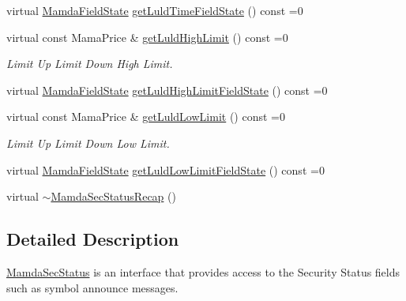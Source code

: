 \begin{CompactItemize}
virtual \hyperlink{namespaceWombat_93aac974f2ab713554fd12a1fa3b7d2a}{Mamda\-Field\-State} \hyperlink{classWombat_1_1MamdaSecStatusRecap_db80d6bb0167935b3b622d6dde3a42bd}{get\-Luld\-Time\-Field\-State} () const =0
\item 
virtual const Mama\-Price \& \hyperlink{classWombat_1_1MamdaSecStatusRecap_832c6a65be3a072fb3980f27661f3fd5}{get\-Luld\-High\-Limit} () const =0
\begin{CompactList}\small\item\em Limit Up Limit Down High Limit. \item\end{CompactList}\item 
virtual \hyperlink{namespaceWombat_93aac974f2ab713554fd12a1fa3b7d2a}{Mamda\-Field\-State} \hyperlink{classWombat_1_1MamdaSecStatusRecap_1c7c1b9dd0362117ad1e877fa24a3227}{get\-Luld\-High\-Limit\-Field\-State} () const =0
\item 
virtual const Mama\-Price \& \hyperlink{classWombat_1_1MamdaSecStatusRecap_5c40a583386f3c02006e31381fd99b17}{get\-Luld\-Low\-Limit} () const =0
\begin{CompactList}\small\item\em Limit Up Limit Down Low Limit. \item\end{CompactList}\item 
virtual \hyperlink{namespaceWombat_93aac974f2ab713554fd12a1fa3b7d2a}{Mamda\-Field\-State} \hyperlink{classWombat_1_1MamdaSecStatusRecap_8d51b8657752bef75f47ede1edd1ae6b}{get\-Luld\-Low\-Limit\-Field\-State} () const =0
\item 
virtual \hyperlink{classWombat_1_1MamdaSecStatusRecap_339807ec21e46d93961081c71b311b38}{$\sim$Mamda\-Sec\-Status\-Recap} ()
\end{CompactItemize}


\subsection{Detailed Description}
\hyperlink{classWombat_1_1MamdaSecStatus}{Mamda\-Sec\-Status} is an interface that provides access to the Security Status fields such as symbol announce messages. 



